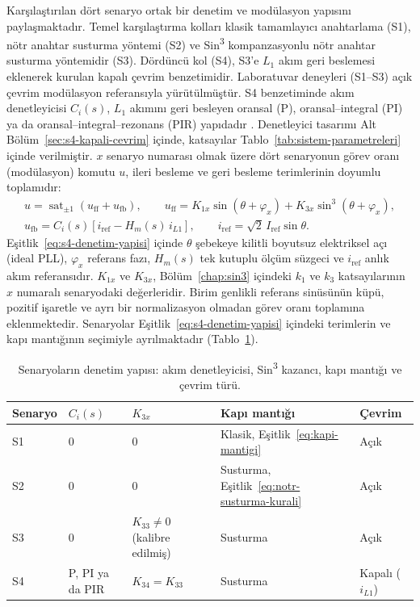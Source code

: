 Karşılaştırılan dört senaryo ortak bir denetim ve modülasyon yapısını paylaşmaktadır. Temel karşılaştırma kolları klasik tamamlayıcı anahtarlama (S1), nötr anahtar susturma yöntemi (S2) ve Sin\textsuperscript{3} kompanzasyonlu nötr anahtar susturma yöntemidir (S3). Dördüncü kol (S4), S3'e $L_1$ akım geri beslemesi eklenerek kurulan kapalı çevrim benzetimidir. Laboratuvar deneyleri (S1--S3) açık çevrim modülasyon referansıyla yürütülmüştür. S4 benzetiminde akım denetleyicisi $C_i(s)$, $L_1$ akımını geri besleyen oransal (P), oransal--integral (PI) ya da oransal--integral--rezonans (PIR) yapıdadır \citep{Teodorescu2006PR,Zhang2014PR}. Denetleyici tasarımı Alt Bölüm~\ref{sec:s4-kapali-cevrim} içinde, katsayılar Tablo~\ref{tab:sistem-parametreleri} içinde verilmiştir. $x$ senaryo numarası olmak üzere dört senaryonun görev oranı (modülasyon) komutu $u$, ileri besleme ve geri besleme terimlerinin doyumlu toplamıdır:
\begin{equation}
  \begin{gathered}
    u=\operatorname{sat}_{\pm1}\!\left(u_{\mathrm{ff}}+u_{\mathrm{fb}}\right),\qquad
    u_{\mathrm{ff}}=K_{1x}\sin(\theta+\varphi_x)+K_{3x}\sin^3(\theta+\varphi_x),\\
    u_{\mathrm{fb}}=C_i(s)\left[i_{\mathrm{ref}}-H_m(s)\,i_{L1}\right],\qquad
    i_{\mathrm{ref}}=\sqrt2\,I_{\mathrm{ref}}\sin\theta .
  \end{gathered}
  \label{eq:s4-denetim-yapisi}
\end{equation}
Eşitlik~\eqref{eq:s4-denetim-yapisi} içinde $\theta$ şebekeye kilitli boyutsuz elektriksel açı (ideal PLL), $\varphi_x$ referans fazı, $H_m(s)$ tek kutuplu ölçüm süzgeci ve $i_{\mathrm{ref}}$ anlık akım referansıdır. $K_{1x}$ ve $K_{3x}$, Bölüm~\ref{chap:sin3} içindeki $k_1$ ve $k_3$ katsayılarının $x$ numaralı senaryodaki değerleridir. Birim genlikli referans sinüsünün küpü, pozitif işaretle ve ayrı bir normalizasyon olmadan görev oranı toplamına eklenmektedir. Senaryolar Eşitlik~\eqref{eq:s4-denetim-yapisi} içindeki terimlerin ve kapı mantığının seçimiyle ayrılmaktadır (Tablo~\ref{tab:senaryo-denetim}).

\begin{table}[H]
  \centering
  \caption{Senaryoların denetim yapısı: akım denetleyicisi, Sin\textsuperscript{3} kazancı, kapı mantığı ve çevrim türü.}
  \label{tab:senaryo-denetim}
  \small
  \begin{tabular}{l l l l l}
    \toprule
    Senaryo & $C_i(s)$ & $K_{3x}$ & Kapı mantığı & Çevrim \\
    \midrule
    S1 & 0 & 0 & Klasik, Eşitlik~\eqref{eq:kapi-mantigi} & Açık \\
    S2 & 0 & 0 & Susturma, Eşitlik~\eqref{eq:notr-susturma-kurali} & Açık \\
    S3 & 0 & $K_{33}\neq0$ (kalibre edilmiş) & Susturma & Açık \\
    S4 & P, PI ya da PIR & $K_{34}=K_{33}$ & Susturma & Kapalı ($i_{L1}$) \\
    \bottomrule
  \end{tabular}
\end{table}

